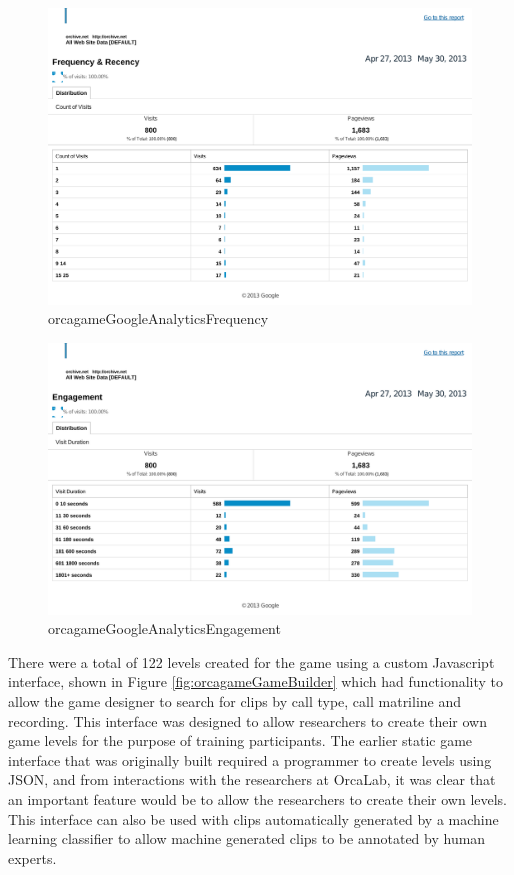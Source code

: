 \documentclass[12pt,oneside]{book}
\begin{document}
\begin{figure}[h]
\centering
\includegraphics[width=\columnwidth]{figures/orcagameGoogleAnalyticsFrequency}
\caption{orcagameGoogleAnalyticsFrequency}
\label{fig:orcagameGoogleAnalyticsFrequency}
\end{figure}


\begin{figure}[h]
\centering
\includegraphics[width=\columnwidth]{figures/orcagameGoogleAnalyticsEngagement}
\caption{orcagameGoogleAnalyticsEngagement}
\label{fig:orcagameGoogleAnalyticsEngagement}
\end{figure}


There were a total of 122 levels created for the game using a custom
Javascript interface, shown in Figure \ref{fig:orcagameGameBuilder}
which had functionality to allow the game designer to search for clips
by call type, call matriline and recording.  This interface was
designed to allow researchers to create their own game levels for the
purpose of training participants.  The earlier static game interface
that was originally built required a programmer to create levels using
JSON, and from interactions with the researchers at OrcaLab, it was
clear that an important feature would be to allow the researchers to
create their own levels.  This interface can also be used with
clips automatically generated by a machine learning classifier to
allow machine generated clips to be annotated by human experts.
\end{document}
